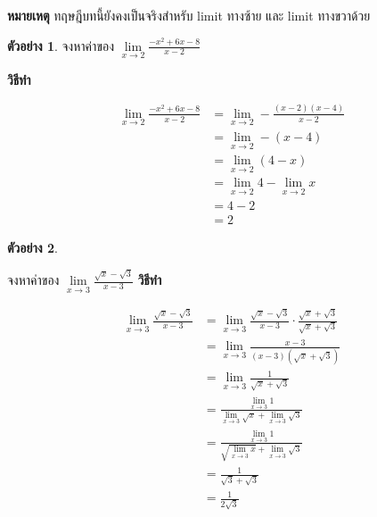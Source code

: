 \documentclass[
]{book}
\theoremstyle{definition}
\theoremstyle{definition}
\newtheorem{example}{ตัวอย่าง}[chapter]
\theoremstyle{definition}
\theoremstyle{definition}
\theoremstyle{remark}
\begin{document}
\textbf{หมายเหตุ} ทฤษฎีบทนี้ยังคงเป็นจริงสำหรับ limit ทางซ้าย และ limit ทางขวาด้วย

\begin{example}
\protect\hypertarget{exm:ex-limit-3}{}\label{exm:ex-limit-3}จงหาค่าของ \(\underset{x\rightarrow 2}{\lim}\frac{-x^{2}+6x-8}{x-2}\)
\end{example}

\textbf{วิธีทำ}

\begin{equation}
  \begin{aligned}
    \lim_{x\rightarrow 2}\frac{-x^{2}+6x-8}{x-2}
    &= \lim_{x\rightarrow 2} -\frac{\left( x-2\right) \left( x-4\right) }{x-2}\\
    &= \lim_{x\rightarrow 2} -\left( x-4\right) \\ %
    &= \lim_{x\rightarrow 2}\left( 4-x\right) \\
    &= \lim_{x\rightarrow 2}4-\lim_{x\rightarrow 2}x\\
    &= 4-2 \\
    &= 2
  \end{aligned}
\end{equation}

\begin{example}
\protect\hypertarget{exm:ex-limit-4}{}\label{exm:ex-limit-4}

จงหาค่าของ \(\underset{x\rightarrow 3}{\lim}\frac{\sqrt{x}-\sqrt{3}}{x-3}\)
\textbf{วิธีทำ}

\begin{equation}
  \begin{aligned}
    \lim_{x\rightarrow 3}\frac{\sqrt{x}-\sqrt{3}}{x-3}
    &= \lim_{x\rightarrow 3}\frac{\sqrt{x}-\sqrt{3}}{x-3}\cdot \frac{\sqrt{x}+\sqrt{3}}{\sqrt{x}+\sqrt{3}} \\
    &= \lim_{x\rightarrow 3}\frac{x-3}{\left( x-3\right) \left( \sqrt{x}+\sqrt{3}\right) } \\
    &= \lim_{x\rightarrow 3}\frac{1}{\sqrt{x}+\sqrt{3}}\\
    &= \frac{\lim_{x\rightarrow 3}1}{\lim_{x\rightarrow 3} \sqrt{x} + \lim_{x\rightarrow 3} \sqrt{3}} \\
    &= \frac{\lim_{x\rightarrow 3}1}{\sqrt{\lim_{x\rightarrow 3}x}+\lim_{x\rightarrow 3}\sqrt{3}} \\
    &= \frac{1}{\sqrt{3}+\sqrt{3}} \\
    &= \frac{1}{2\sqrt{3}} \\
  \end{aligned}
\end{equation}

\end{example}
\end{document}

